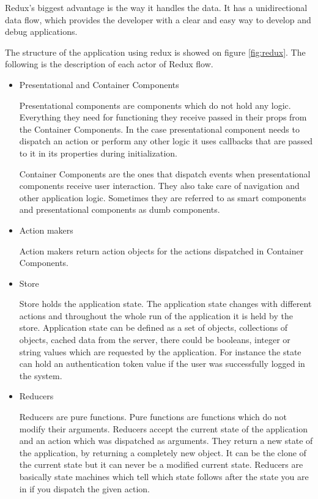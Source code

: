 \documentclass[thesis=M,english]{FITthesis}[2012/10/20]
\begin{document}
Redux's biggest advantage is the way it handles the data. It has a unidirectional data flow, which provides the developer with a clear and easy way to develop and debug applications.

The structure of the application using redux is showed on figure \ref{fig:redux}. The following is the description of each actor of Redux flow.

\begin{itemize}
\item{Presentational and Container Components}

Presentational components are components which do not hold any logic. Everything they need for functioning they receive passed in their props from the Container Components. In the case presentational component needs to dispatch an action or perform any other logic it uses callbacks that are passed to it in its properties during initialization.

Container Components are the ones that dispatch events when presentational components receive user interaction. They also take care of navigation and other application logic. Sometimes they are referred to as smart components and presentational components as dumb components.

\item{Action makers}

Action makers return action objects for the actions dispatched in Container Components.

\item{Store}

Store holds the application state. The application state changes with different actions and throughout the whole run of the application it is held by the store. Application state can be defined as a set of objects, collections of objects, cached data from the server, there could be booleans, integer or string values which are requested by the application. For instance the state can hold an authentication token value if the user was successfully logged in the system.

\item{Reducers}

Reducers are pure functions. Pure functions are functions which do not modify their arguments. Reducers accept the current state of the application and an action which was dispatched as arguments. They return a new state of the application, by returning a completely new object. It can be the clone of the current state but it can never be a modified current state. Reducers are basically state machines which tell which state follows after the state you are in if you dispatch the given action.

\end{itemize}
\end{document}
